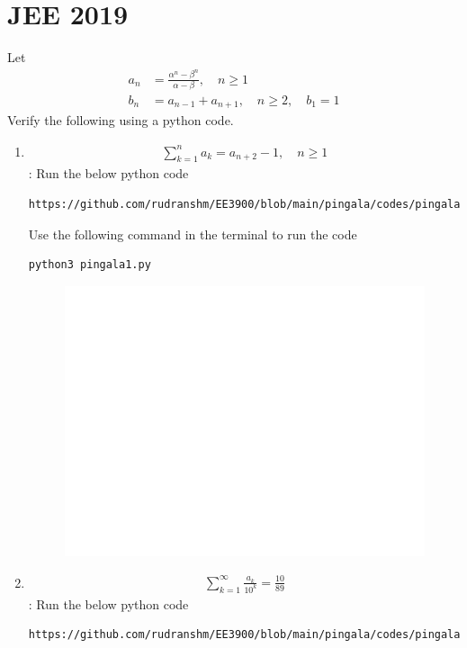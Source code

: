 \documentclass[journal,12pt,twocolumn]{IEEEtran}
\renewcommand\thesection{\arabic{section}}
\begin{document}
\section{JEE 2019}
Let 
\begin{align}
	a_n &= \frac{\alpha^{n}-\beta^{n}}{\alpha - \beta}, \quad n \ge 1
	\\
	b_n &= a_{n-1} + a_{n+1}, \quad n \ge 2, \quad b_1 =1
	\label{eq:10-orig-diff}
\end{align}
Verify the following using a python code.
\begin{enumerate}[label=\thesection.\arabic*
,ref=\thesection.\theenumi]
\item 
\begin{align}
	\sum_{k=1}^{n}a_k = a_{n+2}-1, \quad n \ge 1
\end{align}
\solution:
Run the below python code 
\begin{lstlisting}
https://github.com/rudranshm/EE3900/blob/main/pingala/codes/pingala1.py
\end{lstlisting}
Use the following command in the terminal to run the code
\begin{lstlisting}
python3 pingala1.py
\end{lstlisting}
\begin{figure}[htp]
\centering
\includegraphics[width=0.9\columnwidth]{1.1}
\caption{}
\label{}
\end{figure}
 \item 
\begin{align}
	\sum_{k=1}^{\infty}\frac{a_k}{10^k} =\frac{10}{89}
\end{align}
\solution:
Run the below python code 
\begin{lstlisting}
https://github.com/rudranshm/EE3900/blob/main/pingala/codes/pingala1.py

\end{lstlisting}
\end{enumerate}
\end{document}
